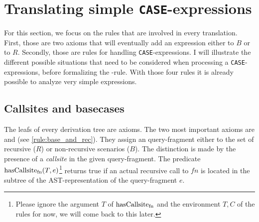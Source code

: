 \section{Translating simple \texttt{CASE}-expressions}

For this section, we focus on the rules that are involved in every translation. First, those are two axioms that will eventually add an expression either to $B$ or to $R$. Secondly, those are rules for handling \texttt{CASE}-expressions. I will illustrate the different possible situations that need to be considered when processing a \texttt{CASE}-expressions, before formalizing the \RWHEN-rule. With those four rules it is already possible to analyze very simple expressions.

\subsection{Callsites and basecases}

The leafs of every derivation tree are axioms. The two most important axioms are \RREC and \RBASE (see \autoref{rule:base_and_rec}). They assign an query-fragment either to the set of recursive ($R$) or non-recursive scenarios ($B$). The distinction is made by the presence of a \textit{callsite} in the given query-fragment. The predicate $\operatorname{\text{hasCallsite}_{fn}}(T, e)$\footnote{Please ignore the argument $T$ of $\operatorname{\text{hasCallsite}_{fn}}$ and the environment $T, C$ of the rules for now, we will come back to this later.} returns true if an actual recursive call to $fn$ is located in the subtree of the AST-representation of the query-fragment $e$.


